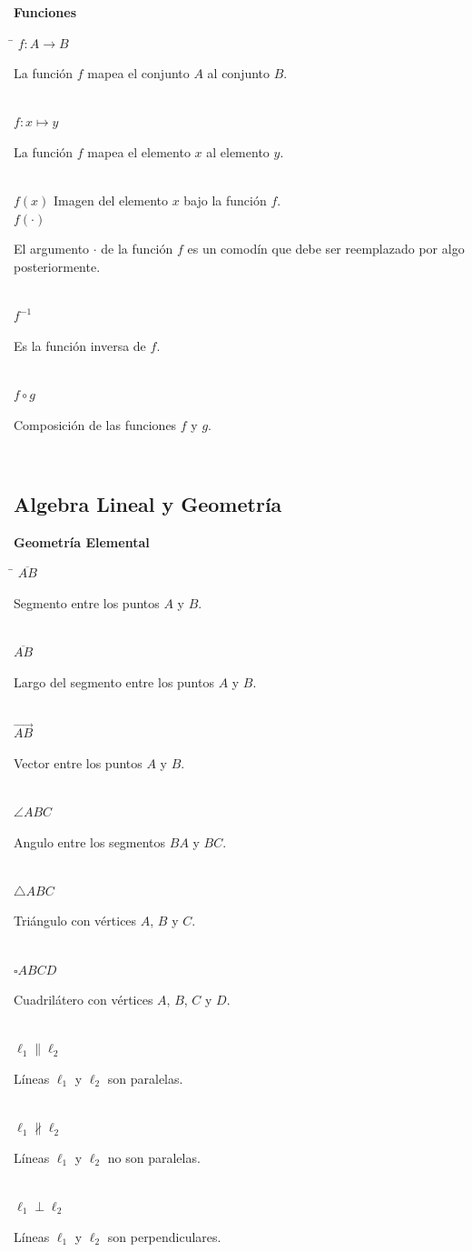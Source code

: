 \documentclass[11pt,letterpaper,twoside]{report}%
\begin{document}
{\bf Funciones}
\begin{tabbing}
\hspace{\hdiml} \= \hspace{\hdim} \kill
$f:A\rightarrow B$ \> \parbox[t]{\hdim}{La función $f$ mapea el conjunto $A$ al conjunto $B$.}\\[\lsk]
$f:x\mapsto y$ \> \parbox[t]{\hdim}{La función $f$ mapea el elemento $x$ al elemento $y$.}\\[\lsk]
$f(x)$ \> Imagen del elemento $x$ bajo la función $f$.\\[\lsk]
$f(\cdot)$ \> \parbox[t]{\hdim}{El argumento $\cdot$ de la función $f$ es un comodín que debe ser reemplazado por algo posteriormente.}\\[\lsk]
$f^{-1}$ \> \parbox[t]{\hdim}{Es la función inversa de $f$.}\\[\lsk]
$f\circ g$ \> \parbox[t]{\hdim}{Composición de las funciones $f$ y $g$.}\\[\lsk]
\end{tabbing}


\newpage
\subsection{Algebra Lineal y Geometría}

{\bf Geometría Elemental}
\begin{tabbing}
\hspace{\hdiml} \= \hspace{\hdim} \kill
$\overline{AB}$ \> \parbox[t]{\hdim}{Segmento entre los puntos $A$ y $B$.}\\[\lsk]
$\overline{AB}$ \> \parbox[t]{\hdim}{Largo del segmento entre los puntos $A$ y $B$.}\\[\lsk]
$\vec{AB}$ \> \parbox[t]{\hdim}{Vector entre los puntos $A$ y $B$.}\\[\lsk]
$\angle{ABC}$ \> \parbox[t]{\hdim}{Angulo entre los segmentos $BA$ y $BC$.}\\[\lsk]
$\triangle{ABC}$ \> \parbox[t]{\hdim}{Triángulo con vértices $A$, $B$ y $C$.}\\[\lsk]
$\square{ABCD}$ \> \parbox[t]{\hdim}{Cuadrilátero con vértices $A$, $B$, $C$ y $D$.}\\[\lsk]
$\ell_1\parallel\ell_2$ \> \parbox[t]{\hdim}{Líneas $\ell_1$ y $\ell_2$ son paralelas.}\\[\lsk]
$\ell_1\nparallel\ell_2$ \> \parbox[t]{\hdim}{Líneas $\ell_1$ y $\ell_2$ no son paralelas.}\\[\lsk]
$\ell_1\perp\ell_2$ \> \parbox[t]{\hdim}{Líneas $\ell_1$ y $\ell_2$ son perpendiculares.}\\[\lsk]
\end{tabbing}
\end{document}
